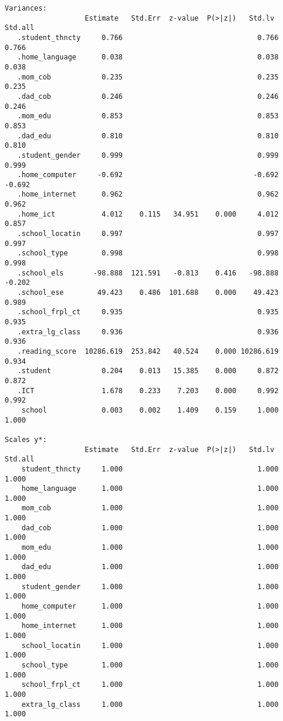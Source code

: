 \documentclass[
]{article}
\begin{document}
\begin{verbatim}
Variances:
                   Estimate   Std.Err  z-value  P(>|z|)   Std.lv   Std.all
   .student_thncty     0.766                                0.766    0.766
   .home_language      0.038                                0.038    0.038
   .mom_cob            0.235                                0.235    0.235
   .dad_cob            0.246                                0.246    0.246
   .mom_edu            0.853                                0.853    0.853
   .dad_edu            0.810                                0.810    0.810
   .student_gender     0.999                                0.999    0.999
   .home_computer     -0.692                               -0.692   -0.692
   .home_internet      0.962                                0.962    0.962
   .home_ict           4.012    0.115   34.951    0.000     4.012    0.857
   .school_locatin     0.997                                0.997    0.997
   .school_type        0.998                                0.998    0.998
   .school_els       -98.888  121.591   -0.813    0.416   -98.888   -0.202
   .school_ese        49.423    0.486  101.688    0.000    49.423    0.989
   .school_frpl_ct     0.935                                0.935    0.935
   .extra_lg_class     0.936                                0.936    0.936
   .reading_score  10286.619  253.842   40.524    0.000 10286.619    0.934
   .student            0.204    0.013   15.385    0.000     0.872    0.872
   .ICT                1.678    0.233    7.203    0.000     0.992    0.992
    school             0.003    0.002    1.409    0.159     1.000    1.000

Scales y*:
                   Estimate   Std.Err  z-value  P(>|z|)   Std.lv   Std.all
    student_thncty     1.000                                1.000    1.000
    home_language      1.000                                1.000    1.000
    mom_cob            1.000                                1.000    1.000
    dad_cob            1.000                                1.000    1.000
    mom_edu            1.000                                1.000    1.000
    dad_edu            1.000                                1.000    1.000
    student_gender     1.000                                1.000    1.000
    home_computer      1.000                                1.000    1.000
    home_internet      1.000                                1.000    1.000
    school_locatin     1.000                                1.000    1.000
    school_type        1.000                                1.000    1.000
    school_frpl_ct     1.000                                1.000    1.000
    extra_lg_class     1.000                                1.000    1.000


\end{verbatim}
\end{document}
